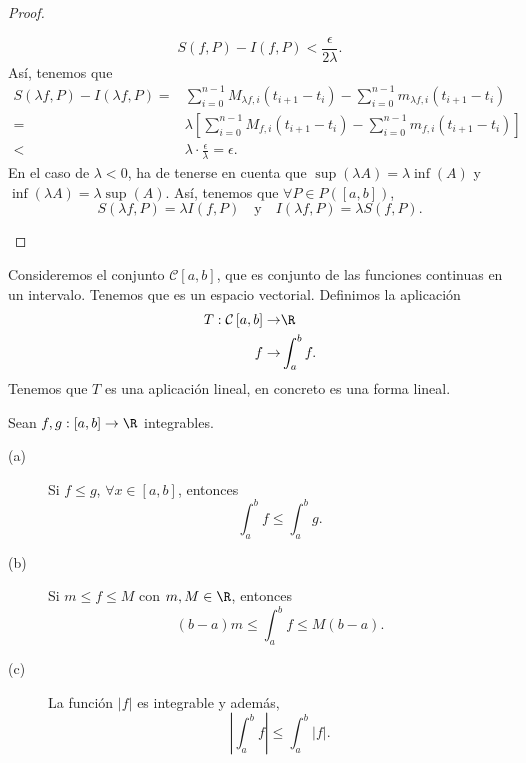 \begin{proof}
\begin{description}
	\[ S\left(f,P\right) - I\left(f,P\right) < \frac{\epsilon }{2\lambda }.\]
	Así, tenemos que 
	\[
	\begin{split}
		S\left(\lambda f,P\right) -I\left(\lambda f, P\right) = & \sum^{n-1}_{i=0}M_{\lambda f,i}\left(t_{i+1}-t_{i}\right) - \sum^{n-1}_{i = 0}m_{\lambda f,i}\left(t_{i+1}-t_{i}\right) \\
		= & \lambda\left[\sum^{n-1}_{i=0}M_{f,i}\left(t_{i+1}-t_{i}\right)-\sum^{n-1}_{i=0}m_{f,i}\left(t_{i+1}-t_{i}\right)\right] \\
		< & \lambda \cdot \frac{\epsilon }{\lambda} = \epsilon.
	\end{split}
	\]
	En el caso de $\displaystyle \lambda < 0 $, ha de tenerse en cuenta que $\displaystyle \sup\left(\lambda A\right) = \lambda \inf\left(A\right) $ y $\displaystyle \inf\left(\lambda A\right) = \lambda \sup\left(A\right)$. Así, tenemos que $\displaystyle \forall P \in P\left(\left[a,b\right] \right) $,
	\[ S\left(\lambda f,P\right) = \lambda I\left(f,P\right) \quad \text{y} \quad I\left(\lambda f,P\right) = \lambda S\left(f,P\right) .\]
\end{description}
\end{proof}
\begin{observation}
	\normalfont Consideremos el conjunto $\displaystyle \mathcal{C}\left[a,b\right]  $, que es conjunto de las funciones continuas en un intervalo. Tenemos que es un espacio vectorial. Definimos la aplicación
	\[
	\begin{split}
	T : \mathcal{C}\left[a,b\right]  \to & \R \\
	f \to & \int^{b}_{a} f .
	\end{split}
	\]
Tenemos que $\displaystyle T $ es una aplicación lineal, en concreto es una forma lineal. 
\end{observation}
\begin{ftheorem}[]
	\normalfont Sean $\displaystyle f,g : \left[a,b\right] \to \R $ integrables.
	\begin{description}
		\item[(a)] Si $\displaystyle f \leq g $, $\displaystyle \forall x \in \left[a,b\right]$, entonces
			\[ \int^{b}_{a} f \leq \int^{b}_{a} g .\]
		\item[(b)] Si $\displaystyle m \leq f \leq M $ con $\displaystyle m,M \in \R $, entonces
			\[\left(b-a\right)m \leq \int^{b}_{a} f \leq M\left(b-a\right) .\]
		\item[(c)] La función $\displaystyle \left|f\right| $ es integrable y además,
			\[ \left|\int^{b}_{a} f \right| \leq \int^{b}_{a} \left|f\right| .\]
	\end{description}
\end{ftheorem}

